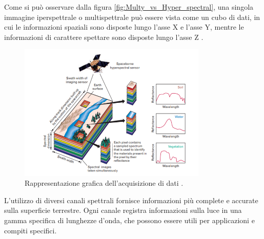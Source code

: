 Come si può osservare dalla figura \ref{fig:Multy_vs_Hyper_spectral}, 
una singola immagine iperspettrale o multispettrale può essere vista come un 
cubo di dati, in cui le informazioni spaziali sono disposte lungo l'asse X e 
l'asse Y, mentre le informazioni di carattere spettare sono disposte 
lungo l'asse Z \cite{Immagini_multispettrali}.
 

\begin{figure}[H]
    \centering
    \includegraphics[width=0.80\textwidth]{Immagini/Generiche/scansionamento_terreno.png}
    \caption{Rappresentazione grafica dell'acquisizione di dati \cite{immagini_multispettrali2} .}
    \label{fig:bho1}
\end{figure}


L'utilizzo di diversi canali spettrali fornisce informazioni più complete e accurate 
sulla superficie terrestre. Ogni canale registra informazioni sulla luce in una gamma 
specifica di lunghezze d'onda, che possono essere utili per applicazioni e compiti 
specifici.




